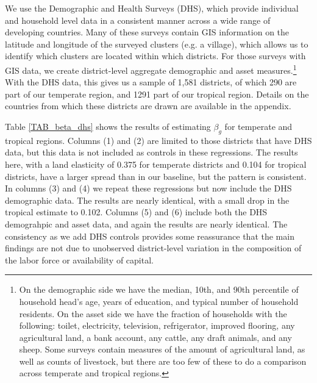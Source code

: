 \documentclass[12pt]{article}
\begin{document}
We use the Demographic and Health Surveys (DHS), which provide individual and household level data in a consistent manner across a wide range of developing countries. Many of these surveys contain GIS information on the latitude and longitude of the surveyed clusters (e.g. a village), which allows us to identify which clusters are located within which districts. For those surveys with GIS data, we create district-level aggregate demographic and asset measures.\footnote{On the demographic side we have the median, 10th, and 90th percentile of household head's age, years of education, and typical number of household residents. On the asset side we have the fraction of households with the following: toilet, electricity, television, refrigerator, improved flooring, any agricultural land, a bank account, any cattle, any draft animals, and any sheep. Some surveys contain measures of the amount of agricultural land, as well as counts of livestock, but there are too few of these to do a comparison across temperate and tropical regions.} With the DHS data, this gives us a sample of 1,581 districts, of which 290 are part of our temperate region, and 1291 part of our tropical region. Details on the countries from which these districts are drawn are available in the appendix.

Table \ref{TAB_beta_dhs} shows the results of estimating $\beta_g$ for temperate and tropical regions. Columns (1) and (2) are limited to those districts that have DHS data, but this data is not included as controls in these regressions. The results here, with a land elasticity of 0.375 for temperate districts and 0.104 for tropical districts, have a larger spread than in our baseline, but the pattern is consistent. In columns (3) and (4) we repeat these regressions but now include the DHS demographic data. The results are nearly identical, with a small drop in the tropical estimate to 0.102. Columns (5) and (6) include both the DHS demograhpic and asset data, and again the results are nearly identical. The consistency as we add DHS controls provides some reassurance that the main findings are not due to unobserved district-level variation in the composition of the labor force or availability of capital.
\end{document}
